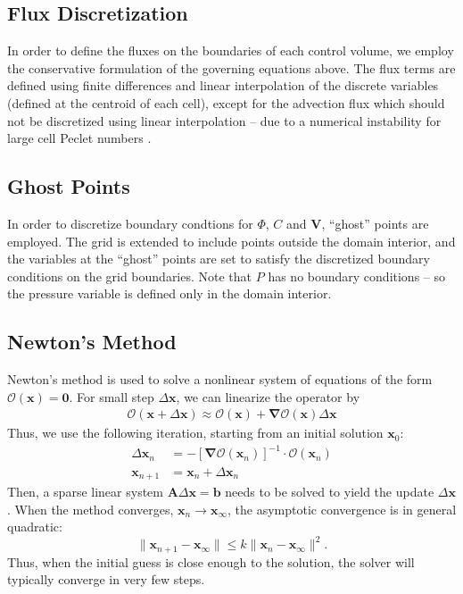 \documentclass[MSc,beforeExam]{iitcsthesis}
\newcommand\bnabla{\boldsymbol{\nabla}}
\newcommand\bV{\boldsymbol{V}}
\newcommand\bx{\boldsymbol{x}}
\newcommand\bzero{\boldsymbol{0}}
\newcommand\cO{\mathcal{O}}
\begin{document}
\subsection{Flux Discretization}

In order to define the fluxes on the boundaries of each control volume, we employ the 
conservative formulation of the governing equations above. 
The flux terms are defined using finite differences and linear interpolation of the discrete 
variables (defined at the centroid of each cell), except for the advection flux which should not be 
discretized using linear interpolation -- due to a numerical instability 
for large cell Peclet numbers \cite{strikwerda2004finite}.

\subsection{Ghost Points}
In order to discretize boundary condtions for $\varPhi$, $C$ and $\bV$, 
``ghost'' points are employed. 
The grid is extended to include points outside the domain interior,
and the variables at the ``ghost'' points are set to satisfy 
the discretized boundary conditions on the grid boundaries.
Note that $P$ has no boundary conditions -- so the pressure variable is defined 
only in the domain interior.

\subsection{Newton's Method}
Newton's method is used to solve a nonlinear system of equations of the form $\cO(\bx) = \bzero$.
For small step $\Delta\bx$, we can linearize the operator by
\begin{align}
\cO(\bx + \Delta\bx) \approx \cO(\bx) + \bnabla \cO(\bx) \Delta\bx
\end{align}
Thus, we use the following iteration, starting from an initial solution $\bx_0$:
\begin{align}
\Delta\bx_n &= - \left[\bnabla \cO(\bx_n)\right]^{-1} \cdot \cO(\bx_n) \\
\bx_{n+1} &= \bx_n + \Delta\bx_n
\end{align}
Then, a sparse linear system $\boldsymbol{A} \Delta \bx = \boldsymbol{b}$
needs to be solved to yield the update $\Delta \bx$.
When the method converges, $\bx_n \rightarrow \bx_\infty$, 
the asymptotic convergence is in general quadratic:
\begin{equation}
\|\bx_{n+1} - \bx_\infty\| \le k \|\bx_{n} - \bx_\infty\|^2.
\end{equation}
Thus, when the initial guess is close enough to the solution, the solver
will typically converge in very few steps.
\end{document}
